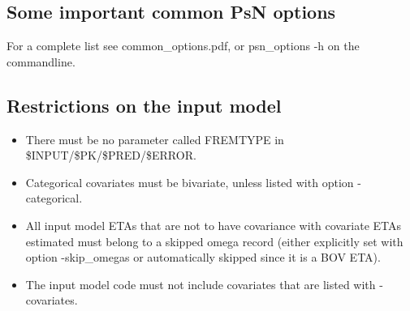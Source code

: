 \subsection{Some important common PsN options}
For a complete list see common\_options.pdf, 
or psn\_options -h on the commandline.



\subsection{Restrictions on the input model}
\begin{itemize}
	\item There must be no parameter called FREMTYPE in \$INPUT/\$PK/\$PRED/\$ERROR.
	\item Categorical covariates must be bivariate, unless listed with option -categorical.
    \item All input model ETAs that are not to have covariance with covariate ETAs estimated must
    belong to a skipped omega record (either explicitly set with option -skip\_omegas or
    automatically skipped since it is a BOV ETA).
    \item The input model code must not include covariates that are listed with 
    -covariates.

\end{itemize}
